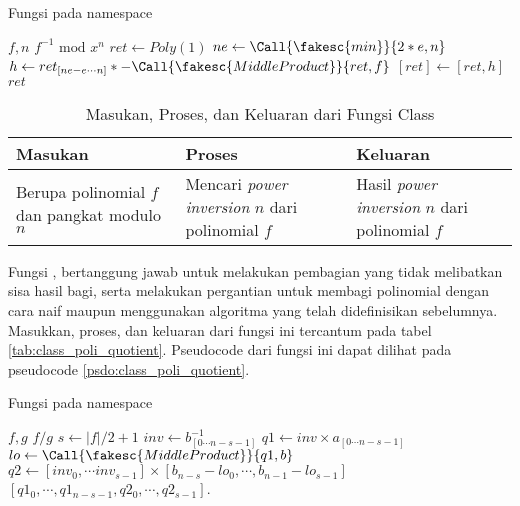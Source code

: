 \begin{algorithm}
	\caption{Fungsi  pada namespace }
	\label{psdo:class_poli_inverse}
	\begin{algorithmic}[1]
		\Require $ f, n $
		\Ensure $ f^{-1} \text{ mod } x^{n}$
		\State $ ret \leftarrow Poly(1) $
			\State $ ne \leftarrow \Call{\fakesc{min}}{2 * e, n}$
			\State $ h \leftarrow ret_{[ne - e \cdots n]} * - \Call{\fakesc{MiddleProduct}}{ret, f}$
			\State $ [ret] \leftarrow [ret , h] $
		\EndFor
		\State \Return $ ret $
	\end{algorithmic}
\end{algorithm}

\begin{table}[]	
	\Centering
	\begin{tabular}{|p{3cm}|p{3cm}|p{3cm}|}
	\hline
	Masukan & Proses & Keluaran \\ \hline
	Berupa polinomial $f$ dan pangkat modulo $n$ & Mencari \textit{power inversion} $n$ dari polinomial $f$ & Hasil \textit{power inversion} $n$ dari polinomial $f$\\ \hline
	\end{tabular}
	\caption{Masukan, Proses, dan Keluaran dari Fungsi  Class }
	\label{tab:class_poli_inverse}
\end{table}

\newpage

Fungsi , bertanggung jawab untuk melakukan pembagian yang tidak melibatkan sisa hasil bagi, serta melakukan pergantian untuk membagi polinomial dengan cara naif maupun menggunakan algoritma yang telah didefinisikan sebelumnya. Masukkan, proses, dan keluaran dari fungsi ini tercantum pada tabel \ref{tab:class_poli_quotient}. Pseudocode dari fungsi ini dapat dilihat pada pseudocode \ref{psdo:class_poli_quotient}.

\begin{algorithm}
	\caption{Fungsi  pada namespace }
	\label{psdo:class_poli_quotient}
	\begin{algorithmic}[1]
		\Require $ f, g $
		\Ensure $ f / g $
			\State \Return {}
		\EndIf
		\State $ s \leftarrow |f| / 2 + 1 $
		\State $ inv \leftarrow b_{[0 \cdots n - s - 1]}^{-1} $
		\State $ q1 \leftarrow inv \times a_{[0 \cdots n - s - 1]} $
		\State $ lo \leftarrow \Call{\fakesc{MiddleProduct}}{q1, b} $
		\State $ q2 \leftarrow \left[ inv_0, \cdots inv_{s-1} \right] \times \left[ b_{n-s} - lo_{0}, \cdots,  b_{n-1} - lo_{s-1} \right] $
		\State \Return $ [q1_0, \cdots, q1_{n-s-1}, q2_0, \cdots, q2_{s-1}] $.
	\end{algorithmic}
\end{algorithm}

